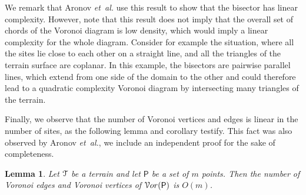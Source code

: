 \documentclass[12pt]{article}
\newtheorem{lemma}[theorem]{Lemma}\newtheorem{definition}[theorem]{Definition}
\newcommand{\lemlab}[1]{\label{lemma:#1}}
\newcommand{\etal}{\textit{et~al.}\xspace}
\newcommand{\Terrain}{\EuScript{T}}
\newcommand{\Sites}{\mathsf{P}}
\newcommand{\VD}[1]{\EuScript{V}or(#1)}
\newcommand{\chords}{chords\xspace}
\begin{document}
We remark that Aronov \etal use this result to show that the bisector
has linear complexity.  However, note that this result does not imply
that the overall set of \chords of the Voronoi diagram is low density,
which would imply a linear complexity for the whole diagram.  Consider
for example the situation, where all the sites lie close to each other
on a straight line, and all the triangles of the terrain surface are
coplanar.  In this example, the bisectors are pairwise parallel lines,
which extend from one side of the domain to the other and could
therefore lead to a quadratic complexity Voronoi diagram by
intersecting many triangles of the terrain.

Finally, we observe that the number of Voronoi vertices and edges is
linear in the number of sites, as the following lemma and corollary
testify.  This fact was also observed by Aronov \etal, we include an
independent proof for the sake of completeness.

\begin{lemma}
    Let $\Terrain$ be a terrain and let $\Sites$ be a set of $m$
    points.  Then the number of Voronoi edges and Voronoi vertices of
    $\VD{\Sites}$ is $O(m)$.
    
    \lemlab{nr:V:e:v}
\end{lemma}
   
\end{document}
